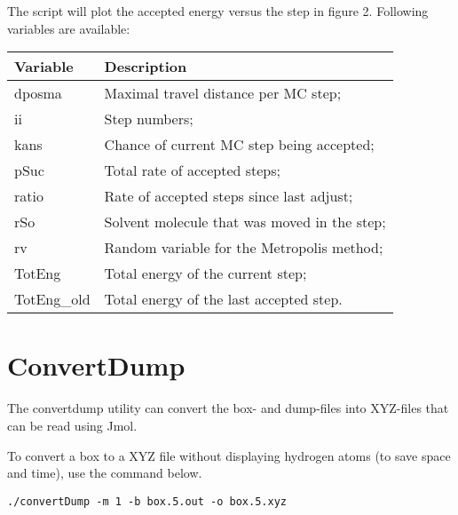 The script will plot the accepted energy versus the step in figure 2. Following 
variables are available:

\begin{tabular}{ll}
	Variable & Description \\ \hline
	dposma & Maximal travel distance per MC step; \\
	ii & Step numbers; \\
	kans & Chance of current MC step being accepted; \\
	pSuc & Total rate of accepted steps; \\
	ratio & Rate of accepted steps since last adjust; \\
	rSo & Solvent molecule that was moved in the step; \\
	rv & Random variable for the Metropolis method; \\
	TotEng & Total energy of the current step; \\
	TotEng\_old & Total energy of the last accepted step. \\
\end{tabular}

\section{ConvertDump}
The convertdump utility can convert the box- and dump-files into XYZ-files that 
can be read using Jmol.

To convert a box to a XYZ file without displaying hydrogen atoms (to save space 
and time), use the command below.

\begin{lstlisting}[caption=Convert a box to a XYZ file]
./convertDump -m 1 -b box.5.out -o box.5.xyz
\end{lstlisting}